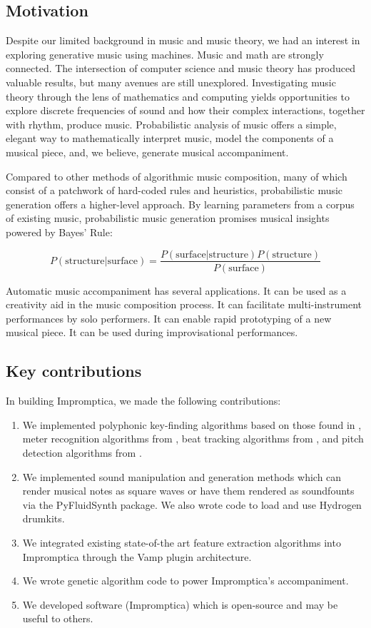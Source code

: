 \documentclass[11pt,conference,letterpaper]{IEEEtran}
\begin{document}
\subsection{Motivation}

Despite our limited background in music and music theory, we had an interest in exploring generative music using machines. Music and math are strongly connected. The intersection of computer science and music theory has produced valuable results, but many avenues are still unexplored. Investigating music theory through the lens of mathematics and computing yields opportunities to explore discrete frequencies of sound and how their complex interactions, together with rhythm, produce music. Probabilistic analysis of music offers a simple, elegant way to mathematically interpret music, model the components of a musical piece, and, we believe, generate musical accompaniment.

Compared to other methods of algorithmic music composition, many of which consist of a patchwork of hard-coded rules and heuristics, probabilistic music generation offers a higher-level approach. By learning parameters from a corpus of existing music, probabilistic music generation promises musical insights powered by Bayes' Rule:

{\small
  \[ P(\text{structure}|\text{surface}) = \frac{P(\text{surface}|\text{structure})P(\text{structure})}{P(\text{surface})} \]
}

Automatic music accompaniment has several applications. It can be used as a creativity aid in the music composition process. It can facilitate multi-instrument performances by solo performers. It can enable rapid prototyping of a new musical piece. It can be used during improvisational performances.

\subsection{Key contributions}

In building Impromptica, we made the following contributions:

\begin{enumerate}
        \item{We implemented polyphonic key-finding algorithms based on those found in \cite{temperly2007mprob}, meter recognition algorithms from \cite{klapuri2006analysis}, beat tracking algorithms from \cite{ellis2007beat}, and pitch detection algorithms from \cite{klapuri2003multiple}.}
        \item{We implemented sound manipulation and generation methods which can render musical notes as square waves or have them rendered as soundfounts via the PyFluidSynth package. We also wrote code to load and use Hydrogen drumkits.}
        \item{We integrated existing state-of-the art feature extraction algorithms into Impromptica through the Vamp plugin architecture.}
        \item{We wrote genetic algorithm code to power Impromptica's accompaniment.}
        \item{We developed software (Impromptica) which is open-source and may be useful to others.}
\end{enumerate}
\end{document}
